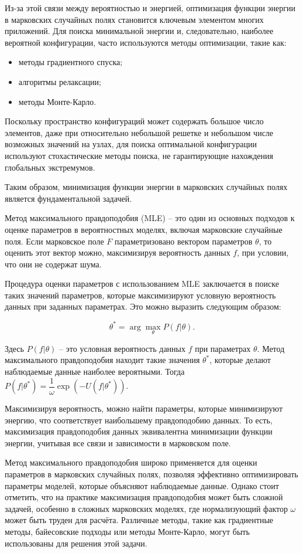 Из-за этой связи между вероятностью и энергией, оптимизация функции энергии в марковских случайных полях становится ключевым элементом многих приложений. Для поиска минимальной энергии и, следовательно, наиболее вероятной конфигурации, часто используются методы оптимизации, такие как:

\begin{itemize}
	\item методы градиентного спуска;
	\item алгоритмы релаксации;
	\item методы Монте-Карло.
\end{itemize}

Поскольку пространство конфигураций может содержать большое число элементов, даже при относительно небольшой решетке и небольшом числе возможных значений на узлах, для поиска оптимальной конфигурации используют стохастические методы поиска, не гарантирующие нахождения глобальных экстремумов.

Таким образом, минимизация функции энергии в марковских случайных полях является фундаментальной задачей.

Метод максимального правдоподобия (MLE) -- это один из основных подходов к оценке параметров в вероятностных моделях, включая марковские случайные поля. Если марковское поле $F$ параметризовано вектором параметров $\theta$, то оценить этот вектор можно, максимизируя вероятность данных $f$, при условии, что они не содержат шума.

Процедура оценки параметров с использованием MLE заключается в поиске таких значений параметров, которые максимизируют условную вероятность данных при заданных параметрах. Это можно выразить следующим образом:

$$\theta^* = \arg\max\limits_\theta P(f | \theta).$$

Здесь $P(f | \theta)$ -- это условная вероятность данных $f$ при параметрах $\theta$. Метод максимального правдоподобия находит такие значения $\theta^*$, которые делают наблюдаемые данные наиболее вероятными. Тогда $P(f | \theta^*) = \dfrac{1}{\omega} \exp (-U(f|\theta^*))$.

Максимизируя вероятность, можно найти параметры, которые минимизируют энергию, что соответствует наибольшему правдоподобию данных. То есть, максимизация правдоподобия данных эквивалентна минимизации функции энергии, учитывая все связи и зависимости в марковском поле.

Метод максимального правдоподобия широко применяется для оценки параметров в марковских случайных полях, позволяя эффективно оптимизировать параметры моделей, которые объясняют наблюдаемые данные. Однако стоит отметить, что на практике максимизация правдоподобия может быть сложной задачей, особенно в сложных марковских моделях, где нормализующий фактор $\omega$ может быть труден для расчёта. Различные методы, такие как градиентные методы, байесовские подходы или методы Монте-Карло, могут быть использованы для решения этой задачи.

